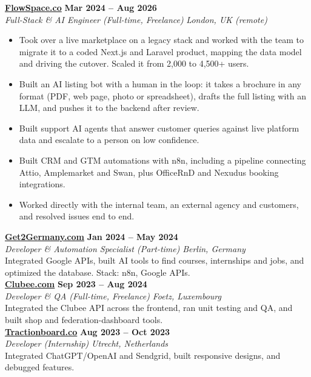 \documentclass[a4paper,10pt]{article}
\newcommand{\role}[4]{%
 \textbf{#1} \hfill \textbf{#2}\\[1pt]%
 \textit{#3} \hfill \textit{#4}\\[2pt]%
}
\begin{document}
\role{\href{https://flowspace.co}{FlowSpace.co}}{Mar 2024 -- Aug 2026}{Full-Stack \& AI Engineer (Full-time, Freelance)}{London, UK (remote)}
\begin{itemize}
 \item Took over a live marketplace on a legacy stack and worked with the team to migrate it to a coded Next.js and Laravel product, mapping the data model and driving the cutover. Scaled it from 2,000 to 4,500+ users.
 \item Built an AI listing bot with a human in the loop: it takes a brochure in any format (PDF, web page, photo or spreadsheet), drafts the full listing with an LLM, and pushes it to the backend after review.
 \item Built support AI agents that answer customer queries against live platform data and escalate to a person on low confidence.
 \item Built CRM and GTM automations with n8n, including a pipeline connecting Attio, Amplemarket and Swan, plus OfficeRnD and Nexudus booking integrations.
 \item Worked directly with the internal team, an external agency and customers, and resolved issues end to end.
\end{itemize}

\role{\href{https://get2germany.com}{Get2Germany.com}}{Jan 2024 -- May 2024}{Developer \& Automation Specialist (Part-time)}{Berlin, Germany}
Integrated Google APIs, built AI tools to find courses, internships and jobs, and optimized the database. Stack: n8n, Google APIs.\\[1pt]

\role{\href{https://clubee.com}{Clubee.com}}{Sep 2023 -- Aug 2024}{Developer \& QA (Full-time, Freelance)}{Foetz, Luxembourg}
Integrated the Clubee API across the frontend, ran unit testing and QA, and built shop and federation-dashboard tools.\\[1pt]

\role{\href{https://tractionboard.co}{Tractionboard.co}}{Aug 2023 -- Oct 2023}{Developer (Internship)}{Utrecht, Netherlands}
Integrated ChatGPT/OpenAI and Sendgrid, built responsive designs, and debugged features.

\end{document}
